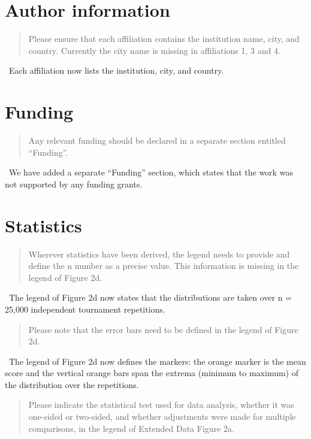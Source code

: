 \documentclass[11pt]{article}
\newcommand{\reply}{\vspace{0.25em}{\color{ForestGreen}\textbf{Reply:}}\ }
\newenvironment{editorcomment}
{\vspace{0.5em}\begin{quote}\color{NavyBlue}}
{\end{quote}}
\begin{document}
\section*{Author information}

\begin{editorcomment}
Please ensure that each affiliation contains the institution name, city, and
country. Currently the city name is missing in affiliations 1, 3 and 4.
\end{editorcomment}

\reply Each affiliation now lists the institution, city, and country.

\section*{Funding}

\begin{editorcomment}
Any relevant funding should be declared in a separate section entitled
``Funding''.
\end{editorcomment}

\reply We have added a separate ``Funding'' section, which states that the work
was not supported by any funding grants.

\section*{Statistics}

\begin{editorcomment}
Wherever statistics have been derived, the legend needs to provide and define
the n number as a precise value. This information is missing in the legend of
Figure 2d.
\end{editorcomment}

\reply The legend of Figure 2d now states that the distributions are taken over
n = 25{,}000 independent tournament repetitions.

\begin{editorcomment}
Please note that the error bars need to be defined in the legend of Figure 2d.
\end{editorcomment}

\reply The legend of Figure 2d now defines the markers: the orange marker is the
mean score and the vertical orange bars span the extrema (minimum to maximum) of
the distribution over the repetitions.

\begin{editorcomment}
Please indicate the statistical test used for data analysis, whether it was
one-sided or two-sided, and whether adjustments were made for multiple
comparisons, in the legend of Extended Data Figure 2a.
\end{editorcomment}
\end{document}
